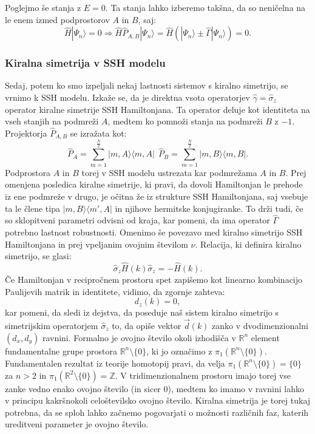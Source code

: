 Poglejmo še stanja z $E = 0$. Ta stanja lahko izberemo takšna, da so neničelna na le enem izmed podprostorov $A$ in $B$, saj:
\begin{equation}
\hat{H} | \Psi_n \rangle = 0  \Rightarrow  \hat{H} \hat{P}_{A,B} |\Psi_n \rangle = \hat{H} ( | \Psi_n \rangle \pm \hat{\Gamma} | \Psi_n \rangle ) = 0.
\end{equation}

\subsubsection{Kiralna simetrija v SSH modelu}
Sedaj, potem ko smo izpeljali nekaj lastnosti sistemov s kiralno simetrijo, se vrnimo k SSH modelu.
Izkaže se, da je direktna vsota operatorjev $\hat{\gamma} = \hat{\sigma}_z$ operator kiralne simetrije SSH Hamiltonjana. Ta operator deluje kot identiteta na vseh stanjih na podmreži $A$, medtem ko pomnoži stanja na podmreži $B$ z $-1$.
Projektorja $\hat{P}_{A,B}$ se izražata kot:
\begin{equation}
\hat{P}_A = \sum_{m=1}^{\frac{N}{2}}  | m, A \rangle \langle m, A | \ \ \hat{P}_B = \sum_{m=1}^{\frac{N}{2}}  | m, B \rangle \langle m, B |.
\end{equation}
Podprostora $A$ in $B$ torej v SSH modelu ustrezata kar podmrežama $A$ in $B$.
Prej omenjena posledica kiralne simetrije, ki pravi, da dovoli Hamiltonjan le prehode iz ene podmreže v drugo, je očitna že iz strukture SSH Hamiltonjana, saj vsebuje ta le člene tipa $ |m, B \rangle \langle m' , A | $ in njihove hermitske konjugiranke. To drži tudi, če so sklopitveni parametri odvisni od kraja, kar pomeni, da ima operator $\hat{\Gamma}$ potrebno lastnost robustnosti.
Omenimo še povezavo med kiralno simetrijo SSH Hamiltonjana in prej vpeljanim ovojnim številom $\nu$.
Relacija, ki definira kiralno simetrijo, se glasi: 
\begin{equation}
\hat{\sigma}_z \hat{H}(k) \hat{\sigma}_z = - \hat{H}(k).
\end{equation}
Če Hamiltonjan v recipročnem prostoru spet zapišemo kot linearno kombinacijo Paulijevih matrik in identitete, vidimo, da zgornje zahteva:
\begin{equation}
d_z (k) = 0,
\end{equation}
kar pomeni, da sledi iz dejstva, da poseduje naš sistem kiralno simetrijo s simetrijskim operatorjem $\hat{\sigma}_z$ to, da opiše vektor $\vec{d}(k)$ zanko v dvodimenzionalni $(d_x,d_y)$ ravnini. Formalno je ovojno število okoli izhodišča v $\mathbb{R}^n$ element fundamentalne grupe prostora $\mathbb{R}^n \setminus \{0\}$, ki jo označimo z $\pi_1 ( \mathbb{R}^n \setminus \{0 \})$. Fundamentalen rezultat iz teorije homotopij \cite{hatcher} pravi, da velja  $\pi_1 ( \mathbb{R}^n \setminus \{0 \}) = \{ 0 \}$ za $n>2$  in  $\pi_1 ( \mathbb{R}^2 \setminus \{0 \}) = \mathbb{Z}$.
V tridimenzionalnem prostoru imajo torej vse zanke vedno enako ovojno število (in sicer $0$), medtem ko imamo v ravnini lahko v principu kakršnokoli celoštevilsko ovojno število. Kiralna simetrija je torej tukaj potrebna, da se sploh lahko začnemo pogovarjati o možnosti različnih faz, katerih ureditveni parameter je ovojno število.

